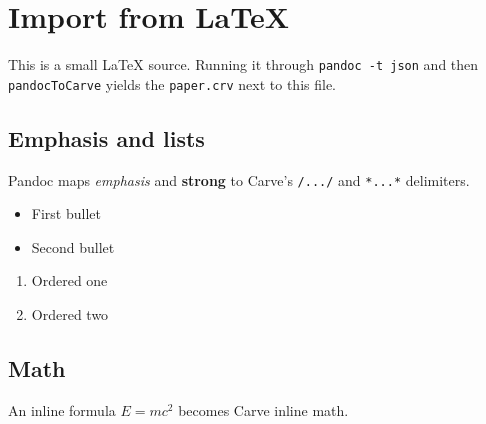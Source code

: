 \section{Import from LaTeX}

This is a small LaTeX source. Running it through \texttt{pandoc -t json} and
then \texttt{pandocToCarve} yields the \texttt{paper.crv} next to this file.

\subsection{Emphasis and lists}

Pandoc maps \emph{emphasis} and \textbf{strong} to Carve's \texttt{/.../} and
\texttt{*...*} delimiters.

\begin{itemize}
  \item First bullet
  \item Second bullet
\end{itemize}

\begin{enumerate}
  \item Ordered one
  \item Ordered two
\end{enumerate}

\subsection{Math}

An inline formula $E = mc^2$ becomes Carve inline math.
